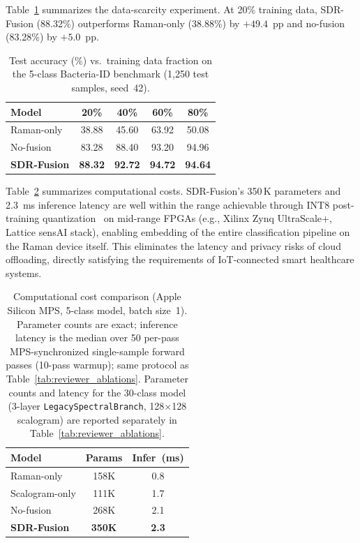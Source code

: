 \documentclass[preprint,12pt]{elsarticle}
\begin{document}
Table~\ref{tab:scarcity} summarizes the data-scarcity experiment. At
20\% training data, SDR-Fusion (88.32\%) outperforms Raman-only (38.88\%) by $+49.4$~pp and
no-fusion (83.28\%) by $+5.0$~pp.

\begin{table}[!t]
\centering
\caption{Test accuracy (\%) vs.\ training data fraction on the 5-class Bacteria-ID benchmark (1,250 test samples, seed~42).}
\label{tab:scarcity}
\renewcommand{\arraystretch}{1.2}
\begin{tabular}{lcccc}
  \toprule
  Model & 20\% & 40\% & 60\% & 80\% \\
  \midrule
  Raman-only        & 38.88 & 45.60 & 63.92 & 50.08 \\
  No-fusion         & 83.28 & 88.40 & 93.20 & 94.96 \\
  \textbf{SDR-Fusion} & \textbf{88.32} & \textbf{92.72} &
                      \textbf{94.72} & \textbf{94.64} \\
  \bottomrule
\end{tabular}
\end{table}

Table~\ref{tab:compute} summarizes computational costs. SDR-Fusion's
350\,K parameters and 2.3~ms inference latency are well within the
range achievable through INT8 post-training quantization~\cite{jacob2018quantization,han2016deep}
on mid-range FPGAs (e.g., Xilinx Zynq UltraScale+, Lattice sensAI stack), enabling
embedding of the entire classification pipeline on the Raman device
itself. This eliminates the latency and privacy risks of cloud
offloading, directly satisfying the requirements of IoT-connected
smart healthcare systems.

\begin{table}[!t]
\centering
\caption{Computational cost comparison (Apple Silicon MPS, 5-class
model, batch size~1). Parameter counts are exact; inference latency
is the median over 50 per-pass MPS-synchronized single-sample forward
passes (10-pass warmup); same protocol as
Table~\ref{tab:reviewer_ablations}.
Parameter counts and latency for the 30-class model (3-layer
\texttt{LegacySpectralBranch}, 128$\times$128 scalogram) are reported
separately in Table~\ref{tab:reviewer_ablations}.}
\label{tab:compute}
\renewcommand{\arraystretch}{1.2}
\begin{tabular}{lcc}
  \toprule
  Model & Params & Infer~(ms) \\
  \midrule
  Raman-only        & 158K & 0.8 \\
  Scalogram-only    & 111K & 1.7 \\
  No-fusion         & 268K & 2.1 \\
  \textbf{SDR-Fusion} & \textbf{350K} & \textbf{2.3} \\
  \bottomrule
\end{tabular}
\end{table}
\end{document}
